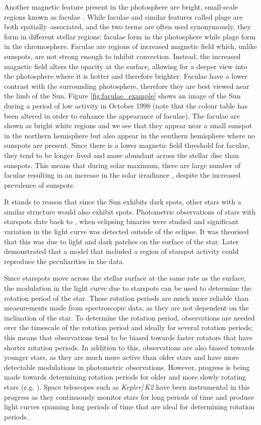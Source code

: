 Another magnetic feature present in the photosphere are bright, small-scale regions known as faculae \citep{Hale_1922}. While faculae and similar features called plage are both spatially--associated, and the two terms are often used synonymously, they form in different stellar regions: faculae form in the photosphere while plage form in the chromosphere. Faculae are regions of increased magnetic field which, unlike sunspots, are not strong enough to inhibit convection. Instead, the increased magnetic field alters the opacity at the surface, allowing for a deeper view into the photosphere where it is hotter and therefore brighter. Faculae have a lower contrast with the surrounding photosphere, therefore they are best viewed near the limb of the Sun. Figure \ref{fig:faculae_example} shows an image of the Sun during a period of low activity in October 1998 (note that the colour table has been altered in order to enhance the appearance of faculae). The faculae are shown as bright white regions and we see that they appear near a small sunspot in the northern hemisphere but also appear in the southern hemisphere where no sunspots are present. Since there is a lower magnetic field threshold for faculae, they tend to be longer--lived and more abundant across the stellar disc than sunspots. This means that during solar maximum, there are large number of faculae resulting in an increase in the solar irradiance \citep{Walton_etal_2003}, despite the increased prevalence of sunspots.

It stands to reason that since the Sun exhibits dark spots, other stars with a similar structure would also exhibit spots. Photometric observations of stars with starspots date back to \citet{Kron_1947}, when eclipsing binaries were studied and significant variation in the light curve was detected outside of the eclipse. It was theorised that this was due to light and dark patches on the surface of the star. Later \citet{Hall_1972} demonstrated that a model that included a region of starspot activity could reproduce the peculiarities in the data.

Since starspots move across the stellar surface at the same rate as the surface, the modulation in the light curve due to starspots can be used to determine the rotation period of the star. These rotation periods are much more reliable than measurements made from spectroscopic data, as they are not dependent on the inclination of the star. To determine the rotation period, observations are needed over the timescale of the rotation period and ideally for several rotation periods; this means that observations tend to be biased towards faster rotators that have shorter rotation periods. In addition to this, observations are also biased towards younger stars, as they are much more active than older stars and have more detectable modulations in photometric observations. However, progress is being made towards determining rotation periods for older and more slowly rotating stars (e.g. \citealt{Barnes_etal_2016,Douglas_etal_2016,Lanzafame_etal_2018}). Space telescopes such as \textit{Kepler}/\textit{K2} have been instrumental in this progress as they continuously monitor stars for long periods of time and produce light curves spanning long periods of time that are ideal for determining rotation periods.

